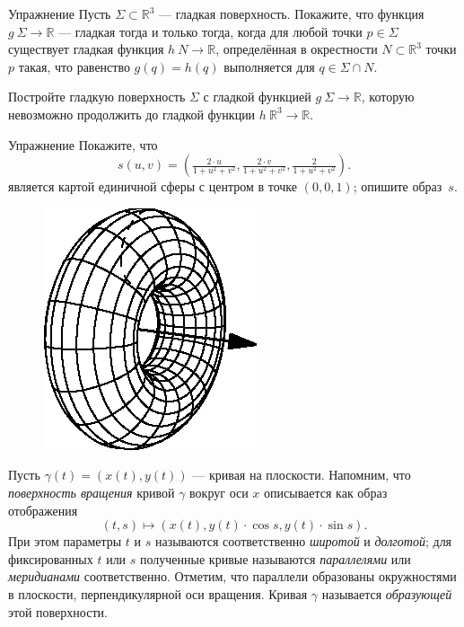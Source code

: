 \begin{thm}{Упражнение}\label{ex:smooth-fun(surf)}
Пусть $\Sigma\subset \mathbb{R}^3$ --- гладкая поверхность.
Покажите, что функция $g\:\Sigma\to\mathbb{R}$ --- гладкая тогда и только тогда, когда для любой точки $p\in \Sigma$ существует гладкая функция $h\:N\to\mathbb{R}$, определённая в окрестности $N\subset \mathbb{R}^3$ точки $p$ такая, что равенство $g(q)=h(q)$ выполняется для $q\in \Sigma\cap N$.

Постройте гладкую поверхность $\Sigma$ с гладкой функцией $g\:\Sigma\to\mathbb{R}$, которую невозможно продолжить до гладкой функции $h\:\mathbb{R}^3\to\mathbb{R}$.
\end{thm}

\begin{thm}{Упражнение}\label{ex:inversion-chart}
Покажите, что
\[s(u,v)=(\tfrac{2\cdot u}{1+u^2+v^2},\tfrac{2\cdot v}{1+u^2+v^2},\tfrac{2}{1+u^2+v^2}).\]
является картой единичной сферы с центром в точке $(0,0,1)$; опишите образ~$s$.
\end{thm}

\begin{figure}
\vskip-6mm
\centering
\includegraphics{asy/torus}
\vskip0mm
\end{figure}

Пусть $\gamma(t)=(x(t),y(t))$ --- кривая на плоскости.
Напомним, что \emph{поверхность вращения} кривой $\gamma$ вокруг оси $x$ описывается как образ отображения 
\[(t, s)\mapsto (x(t), y(t)\cdot\cos s,y(t)\cdot\sin s).\]
При этом параметры $t$ и $s$ называются соответственно \emph{широтой} и \emph{долготой};
для фиксированных $t$ или $s$ полученные кривые называются \emph{параллелями} или
\emph{меридианами} соответственно. 
Отметим, что параллели образованы окружностями в плоскости, перпендикулярной оси вращения.
Кривая $\gamma$ называется \emph{образующей} этой поверхности.

